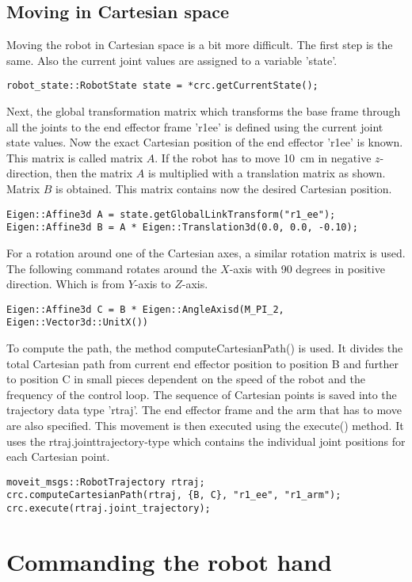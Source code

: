 \documentclass[11pt,a4paper]{report}
\begin{document}
\subsection{Moving in Cartesian space}
Moving the robot in Cartesian space is a bit more difficult. The first step is the same. Also the current joint values are assigned to a variable 'state'.
\begin{verbatim}
robot_state::RobotState state = *crc.getCurrentState();
\end{verbatim}
Next, the global transformation matrix which transforms the base frame through all the joints to the end effector frame 'r1\textunderscore ee' is defined using the current joint state values. Now the exact Cartesian position of the end effector 'r1\textunderscore ee' is known. This matrix is called matrix $A$. If the robot has to move 10~cm in negative $z$-direction, then the  matrix $A$ is multiplied with a translation matrix as shown. Matrix $B$ is obtained. This matrix contains now the desired Cartesian position.
\begin{verbatim}
Eigen::Affine3d A = state.getGlobalLinkTransform("r1_ee");
Eigen::Affine3d B = A * Eigen::Translation3d(0.0, 0.0, -0.10);
\end{verbatim}
For a rotation around one of the Cartesian axes, a similar rotation matrix is used.
The following command rotates around the $X$-axis with 90 degrees in positive direction. Which is from $Y$-axis to $Z$-axis.
\begin{verbatim}
Eigen::Affine3d C = B * Eigen::AngleAxisd(M_PI_2, Eigen::Vector3d::UnitX())
\end{verbatim}
To compute the path, the method computeCartesianPath() is used. It divides the total Cartesian path from current end effector position to position B and further to position C in small pieces dependent on the speed of the robot and the frequency of the control loop. The sequence of Cartesian points is saved into the trajectory data type 'rtraj'. The end effector frame and the arm that has to move are also specified. This movement is then executed using the execute() method. It uses the rtraj.joint\textunderscore trajectory-type which contains the individual joint positions for each Cartesian point.
\begin{verbatim}
moveit_msgs::RobotTrajectory rtraj;
crc.computeCartesianPath(rtraj, {B, C}, "r1_ee", "r1_arm");
crc.execute(rtraj.joint_trajectory);
\end{verbatim}
\section{Commanding the robot hand}
\end{document}

